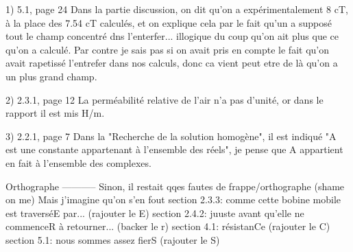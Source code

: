 
1) 5.1, page 24
Dans la partie discussion, on dit qu'on a expérimentalement 8 cT, à la place des 7.54 cT calculés, et on explique 
cela par le fait qu'un a supposé tout le champ concentré dns l'enterfer... illogique du coup qu'on ait plus que ce qu'on a calculé.
Par contre je sais pas si on avait pris en compte le fait qu'on avait rapetissé l'entrefer dans nos calculs, donc ca vient peut
etre de là qu'on a un plus grand champ.

2) 2.3.1, page 12
La perméabilité relative de l'air n'a pas d'unité, or dans le rapport il est mis H/m.

3) 2.2.1, page 7
Dans la "Recherche de la solution homogène", il est indiqué "A est une constante appartenant
à l'ensemble des réels", je pense que A appartient en fait à l'ensemble des complexes.

Orthographe
-----------
Sinon, il restait qqes fautes de frappe/orthographe (shame on me) Mais j'imagine qu'on s'en fout
section 2.3.3: comme cette bobine mobile est traverséE par... (rajouter le E)
section 2.4.2: juuste avant qu'elle ne commenceR à retourner... (backer le r)
section 4.1: résistanCe (rajouter le C)
section 5.1: nous sommes assez fierS (rajouter le S)

